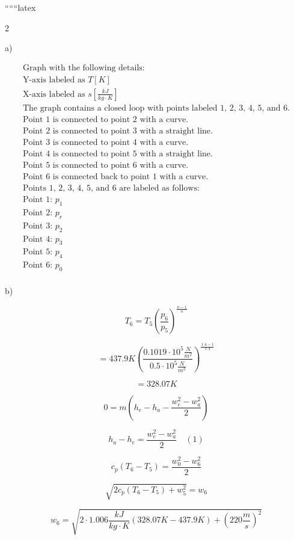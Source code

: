 
``````latex


2

a)

\[
\begin{array}{c}
\text{Graph with the following details:} \\
\text{Y-axis labeled as } T [K] \\
\text{X-axis labeled as } s \left[ \frac{kJ}{kg \cdot K} \right] \\
\text{The graph contains a closed loop with points labeled 1, 2, 3, 4, 5, and 6.} \\
\text{Point 1 is connected to point 2 with a curve.} \\
\text{Point 2 is connected to point 3 with a straight line.} \\
\text{Point 3 is connected to point 4 with a curve.} \\
\text{Point 4 is connected to point 5 with a straight line.} \\
\text{Point 5 is connected to point 6 with a curve.} \\
\text{Point 6 is connected back to point 1 with a curve.} \\
\text{Points 1, 2, 3, 4, 5, and 6 are labeled as follows:} \\
\text{Point 1: } p_1 \\
\text{Point 2: } p_r \\
\text{Point 3: } p_2 \\
\text{Point 4: } p_3 \\
\text{Point 5: } p_4 \\
\text{Point 6: } p_0 \\
\end{array}
\]

b)

\[
T_6 = T_5 \left( \frac{p_6}{p_5} \right)^{\frac{n-1}{n}}
\]

\[
= 437.9 K \left( \frac{0.1019 \cdot 10^5 \frac{N}{m^2}}{0.5 \cdot 10^5 \frac{N}{m^2}} \right)^{\frac{1.4-1}{1.4}}
\]

\[
= 328.07 K
\]

\[
0 = m \left( h_e - h_a - \frac{w_e^2 - w_a^2}{2} \right)
\]

\[
h_a - h_e = \frac{w_e^2 - w_a^2}{2} \quad (1)
\]

\[
c_{p} (T_6 - T_5) = \frac{w_0^2 - w_6^2}{2}
\]

\[
\sqrt{2 c_{p} (T_6 - T_5) + w_5^2} = w_6
\]

\[
w_6 = \sqrt{2 \cdot 1.006 \frac{kJ}{kg \cdot K} (328.07 K - 437.9 K) + (220 \frac{m}{s})^2}
\]


